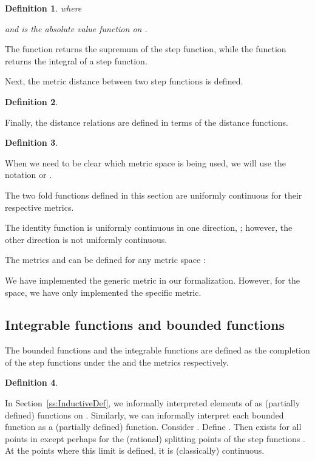 \documentclass{elsarticle}
\newtheorem{definition}{Definition}
\newcommand{\uc}{uniformly continuous}
\begin{document}
\begin{definition}
  
  where
  
  and  is the absolute value function on .
\end{definition}

The function  returns the supremum of the step function, while the function
 returns the integral of a step function.

Next, the metric distance between two step functions is defined.

\begin{definition}
  
\end{definition}

Finally, the distance relations are defined in terms of the distance
functions.

\begin{definition}
  
\end{definition}

When we need to be clear which metric space
is being used, we will use the notation  or .

The two fold functions defined in this section are uniformly continuous for
their respective metrics.

The identity function is {\uc} in one direction, ; however, the other direction
is not {\uc}.

The metrics  and  can be defined for any
metric space :

We have implemented the generic  metric in our
formalization. However, for the  space, we have only implemented the
specific  metric.

\subsection{Integrable functions and bounded functions}\label{ss:IFBF}The
bounded functions and the integrable functions are defined as the completion of the step functions
under the  and the  metrics respectively.

\begin{definition}
  
\end{definition}

In Section~\ref{ss:InductiveDef}, we informally interpreted elements of  as (partially defined) functions on . Similarly, we can informally
interpret each bounded function as a (partially defined) function. Consider . Define . Then
 exists for all points  in
 except perhaps for the (rational) splitting points of the step
functions . At the points where this limit is defined, it is
(classically) continuous.
\end{document}
